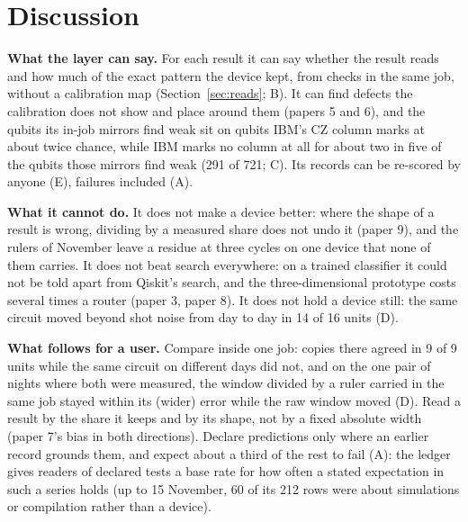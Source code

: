 \documentclass[10pt,a4paper]{article}
\begin{document}
\section{Discussion}\label{sec:discussion}
\textbf{What the layer can say.} For each result it can say whether the result reads and how much of the exact pattern
the device kept, from checks in the same job, without a calibration map (Section~\ref{sec:reads}; B). It can find
defects the calibration does not show and place around them (papers 5 and 6), and the qubits its in-job mirrors find
weak sit on qubits IBM's CZ column marks at about twice chance, while IBM marks no column at all for about two in five of
the qubits those mirrors find weak (291 of 721; C). Its records can be re-scored by anyone (E), failures included (A).

\textbf{What it cannot do.} It does not make a device better: where the shape of a result is wrong, dividing by a measured
share does not undo it (paper 9), and the rulers of November leave a residue at three cycles on one device that none of
them carries. It does not beat search everywhere: on a trained classifier it could not be told apart from Qiskit's
search, and the three-dimensional prototype costs several times a router (paper 3, paper 8). It does not hold a device
still: the same circuit moved beyond shot noise from day to day in 14 of 16 units (D).

\textbf{What follows for a user.} Compare inside one job: copies there agreed in 9 of 9 units while the same circuit on
different days did not, and on the one pair of nights where both were measured, the window divided by a ruler carried in the
same job stayed within its (wider) error while the raw window moved (D). Read a result by the share it keeps and by
its shape, not by a fixed absolute width (paper 7's bias in both directions). Declare predictions only where an earlier
record grounds them, and expect about a third of the rest to fail (A): the ledger gives readers of declared tests a base rate
for how often a stated expectation in such a series holds (up to 15 November, 60 of its 212 rows were about simulations
or compilation rather than a device).
\end{document}
